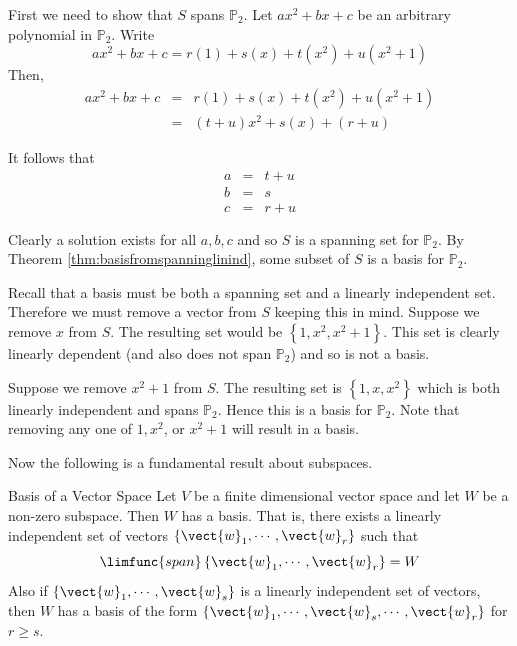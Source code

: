 \begin{solution}
First we need to show that $S$ spans $\mathbb{P}_2$. Let $ax^2 + bx + c$ be an arbitrary polynomial in $\mathbb{P}_2$. Write 
\[
ax^2 + bx + c = r(1) + s(x) + t(x^2) + u (x^2 + 1)
\]
Then,
\begin{eqnarray*}
ax^2 +bx + c &=& r(1) + s(x) + t(x^2) + u (x^2 + 1) \\
&=& (t+u) x^2 + s(x) + (r+u) 
\end{eqnarray*}

It follows that 
\begin{eqnarray*}
a &=& t + u \\
b &=& s \\
c &=& r + u 
\end{eqnarray*}

Clearly a solution exists for all $a,b,c$ and so $S$ is a spanning set for $\mathbb{P}_2$. By Theorem \ref{thm:basisfromspanninglinind}, some subset of $S$ is a basis for $\mathbb{P}_2$. 

Recall that a basis must be both a spanning set and a linearly independent set.
Therefore we must remove a vector from $S$ keeping this in mind. Suppose we remove $x$ from $S$. The resulting set would be $\left\{ 1, x^2, x^2 + 1 \right\}$. This set is clearly linearly dependent (and also does not span $\mathbb{P}_2$) and so is not a basis. 

Suppose we remove $x^2 + 1$ from $S$. The resulting set is $\left\{ 1, x, x^2 \right\}$ which is both linearly independent and spans $\mathbb{P}_2$. Hence this is a basis for $\mathbb{P}_2$. Note that removing any one of $1, x^2$, or $x^2 + 1$ will result in a basis.
\end{solution}

Now the following is a fundamental result about subspaces.

\begin{theorem}{Basis of a Vector Space}\label{thm:basisvectorspace}
Let $V$ be a finite dimensional vector space and let $W$ be
a non-zero subspace. Then $W$ has a basis. That is, there exists a linearly
independent set of vectors $\left\{ \vect{w}_{1},\cdots ,\vect{w}_{r}\right\} $
such that 
\begin{equation*}
\limfunc{span}\left\{ \vect{w}_{1},\cdots ,\vect{w}_{r}\right\} =W
\end{equation*}
Also if $\left\{ \vect{w}_{1},\cdots ,\vect{w}_{s}\right\} $ is a linearly
independent set of vectors, then $W$ has a basis of the form $\left\{ \vect{w}
_{1},\cdots ,\vect{w}_{s},\cdots ,\vect{w}_{r}\right\} $ for $r\geq s$.
\end{theorem}

